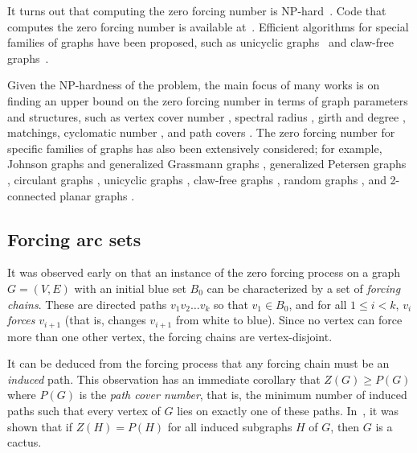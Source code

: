 \documentclass[12pt]{amsart}
\theoremstyle{plain}
\theoremstyle{definition}
\begin{document}
It turns out that computing the zero forcing number is NP-hard~\cite{aazami2008hardness}. 
Code that computes the zero forcing number is available at~\cite{sagecode}. 
Efficient algorithms for special families of graphs have been proposed, such as unicyclic graphs~\cite{row2012technique} and claw-free graphs~\cite{brimkov2022computer}. 


Given the NP-hardness of the problem, the main focus of many works is on finding an upper bound on the zero forcing number in terms of graph parameters and structures, such as 
vertex cover number \cite{brimkov2022computer}, 
spectral radius \cite{das2023spectral, zhang2022zero}, 
girth and degree \cite{butler2013throttling, davila2018bounds, GentnerPensoRautenbachSouza2016, liang2022extremal}, 
matchings\cite{davila2020matching, jing2023zero, trefois2013zero},
cyclomatic number \cite{jing2023zero, wang2020zero}, 
and path covers \cite{davila2020matching, GentnerPensoRautenbachSouza2016, montazeri2020relationship}.  
The zero forcing number for specific families of graphs has also been extensively considered; for example, 
Johnson graphs and generalized Grassmann graphs \cite{abiad2023diameter}, generalized Petersen graphs \cite{alameda2018families},
circulant graphs \cite{duong2020maximum},
unicyclic graphs \cite{row2012technique},
claw-free graphs \cite{brimkov2022computer},
random graphs \cite{bal2021zero, Kalinowskietal2019}, and 
2-connected planar graphs \cite{ison2023zero}.



\subsection{Forcing arc sets}
It was observed early on \cite{barioli2010problems} that 
an instance of the zero forcing process on a graph $G=(V, E)$ with an initial blue set $B_0$ can be characterized by a set of \emph{forcing chains}. These are directed paths $v_1v_2\dots v_k$ so that $v_1\in B_0$, and for all $1\leq i<k$, $v_i$ \emph{forces} $v_{i+1}$ (that is, changes $v_{i+1}$ from white to blue). Since no vertex can force more than one other vertex,  the forcing chains are vertex-disjoint. 


It can be deduced from the forcing process that any forcing chain must be an \emph{induced} path. This observation has an immediate corollary that $Z(G)\ge P(G)$ where $P(G)$ is the \textit{path cover number}, that is, the minimum number of induced paths such that every vertex of $G$ lies on exactly one of these paths. In~\cite{GentnerPensoRautenbachSouza2016}, it was shown that if $Z(H)=P(H)$ for all induced subgraphs $H$ of $G$, then $G$ is a cactus. 
\end{document}
